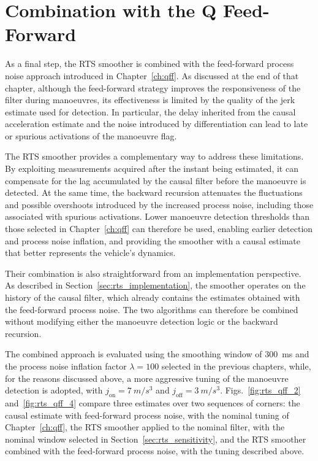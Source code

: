 \section{Combination with the Q Feed-Forward}
\label{sec:rts_qff}

As a final step, the RTS smoother is combined with the feed-forward process noise approach introduced in Chapter~\ref{ch:qff}. As discussed at the end of that chapter, although the feed-forward strategy improves the responsiveness of the filter during manoeuvres, its effectiveness is limited by the quality of the jerk estimate used for detection. In particular, the delay inherited from the causal acceleration estimate and the noise introduced by differentiation can lead to late or spurious activations of the manoeuvre flag.

The RTS smoother provides a complementary way to address these limitations. By exploiting measurements acquired after the instant being estimated, it can compensate for the lag accumulated by the causal filter before the manoeuvre is detected. At the same time, the backward recursion attenuates the fluctuations and possible overshoots introduced by the increased process noise, including those associated with spurious activations. Lower manoeuvre detection thresholds than those selected in Chapter~\ref{ch:qff} can therefore be used, enabling earlier detection and process noise inflation, and providing the smoother with a causal estimate that better represents the vehicle's dynamics.

Their combination is also straightforward from an implementation perspective. As described in Section~\ref{sec:rts_implementation}, the smoother operates on the history of the causal filter, which already contains the estimates obtained with the feed-forward process noise. The two algorithms can therefore be combined without modifying either the manoeuvre detection logic or the backward recursion.

The combined approach is evaluated using the smoothing window of \SI{300}{ms} and the process noise inflation factor $\lambda = 100$ selected in the previous chapters, while, for the reasons discussed above, a more aggressive tuning of the manoeuvre detection is adopted, with $j_{\mathrm{on}} = \SI{7}{m/s^3}$ and $j_{\mathrm{off}} = \SI{3}{m/s^3}$. Figs.~\ref{fig:rts_qff_2} and~\ref{fig:rts_qff_4} compare three estimates over two sequences of corners: the causal estimate with feed-forward process noise, with the nominal tuning of Chapter~\ref{ch:qff}, the RTS smoother applied to the nominal filter, with the nominal window selected in Section~\ref{sec:rts_sensitivity}, and the RTS smoother combined with the feed-forward process noise, with the tuning described above.

